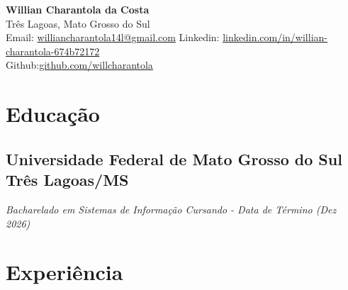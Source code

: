 \documentclass[a4paper,10pt]{article}
\begin{document}
\begin{center}
    {\LARGE \textbf{Willian Charantola da Costa}} 
    \\ [0.1cm]
    Três Lagoas, Mato Grosso do Sul
    \\ [0.1cm]
    {\textbullet}
    Email: \href{mailto:williancharantola14l@gmail.com}{williancharantola14l@gmail.com} 
    {\textbullet}
    Linkedin: \href{https://www.linkedin.com/in/willian-charantola-674b72172/}{linkedin.com/in/willian-charantola-674b72172} 
    \\ [0.1cm]
    {\textbullet}
    Github:\href{https://github.com/willcharantola}{github.com/willcharantola}
\end{center}





\section{Educação}
    \subsection*{\texorpdfstring{
            \textbf{Universidade Federal de Mato Grosso do Sul} \hfill Três Lagoas/MS
        }{
            Universidade Federal de Mato Grosso do Sul (UFMS) -- Campus Três Lagoas
        }}
    \textit{Bacharelado em Sistemas de Informação \hfill Cursando - Data de Término (Dez 2026)}






\section{Experiência}
\end{document}
